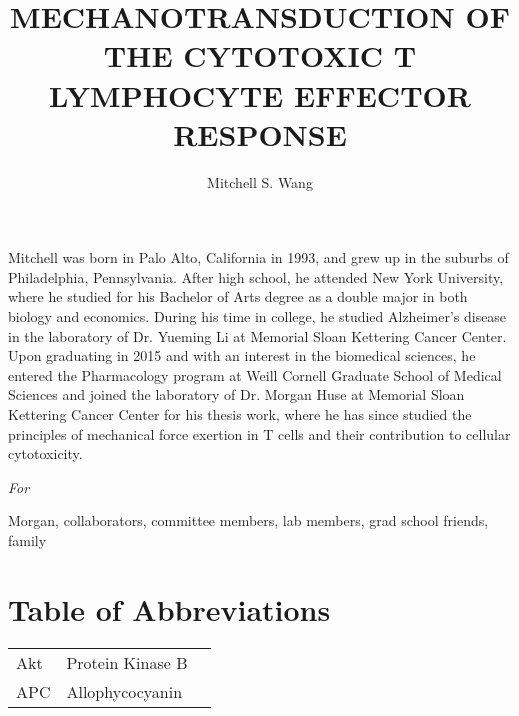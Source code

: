 \documentclass[phd,tocprelim]{cornell}
\title{MECHANOTRANSDUCTION OF THE CYTOTOXIC T LYMPHOCYTE  EFFECTOR RESPONSE}
\author {Mitchell S. Wang}
\renewcommand{\caption}[1]{\singlespacing\hangcaption{#1}\normalspacing}
\begin{document}
\maketitle
\makecopyright

\begin{abstract}

\end{abstract}

\begin{biosketch}
Mitchell was born in Palo Alto, California in 1993, and grew up in the suburbs of Philadelphia, Pennsylvania. After high school, he attended New York University, where he studied for his Bachelor of Arts degree as a double major in both biology and economics. During his time in college, he studied Alzheimer’s disease in the laboratory of Dr. Yueming Li at Memorial Sloan Kettering Cancer Center. Upon graduating in 2015 and with an interest in the biomedical sciences, he entered the Pharmacology program at Weill Cornell Graduate School of Medical Sciences and joined the laboratory of Dr. Morgan Huse at Memorial Sloan Kettering Cancer Center for his thesis work, where he has since studied the principles of mechanical force exertion in T cells and their contribution to cellular cytotoxicity.
\end{biosketch}

\begin{dedication}
\emph{For}
\end{dedication}

\begin{acknowledgements}
Morgan, collaborators, committee members, lab members, grad school friends, family
\end{acknowledgements}

\contentspage
\tablelistpage
\figurelistpage

\normalspacing \setcounter{page}{1} 
\pagestyle{cornell} \addtolength{\parskip}{0.5\baselineskip}

\section{Table of Abbreviations}
\begin{table}
\caption{Table of Abbreviations}
\centering
\begin{tabular}{l m{8cm} l}
	\toprule
	Akt & Protein Kinase B \\
	APC & Allophycocyanin\\
	\bottomrule
	\end{tabular}
	\label{tab:abbreviations}
\end{table}
\end{document}
